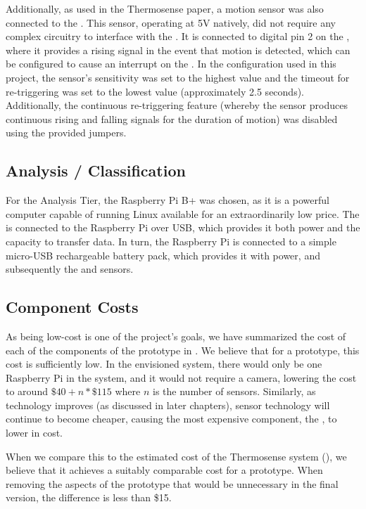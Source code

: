 \documentclass[../thesis/thesis.tex]{subfiles}
\begin{document}
Additionally, as used in the Thermosense paper, a \pir motion sensor \cite{AdafruitPIR} was also connected to the \ard. This sensor, operating at 5V natively, did not require any complex circuitry to interface with the \ard. It is connected to digital pin 2 on the \ard, where it provides a rising signal in the event that motion is detected, which can be configured to cause an interrupt on the \ard. In the configuration used in this project, the sensor's sensitivity was set to the highest value and the timeout for re-triggering was set to the lowest value (approximately 2.5 seconds). Additionally, the continuous re-triggering feature (whereby the sensor produces continuous rising and falling signals for the duration of motion) was disabled using the provided jumpers. 

\subsection{Analysis / Classification}

For the Analysis Tier, the Raspberry Pi B+ was chosen, as it is a powerful computer capable of running Linux available for an extraordinarily low price. The \ard is connected to the Raspberry Pi over USB, which provides it both power and the capacity to transfer data. In turn, the Raspberry Pi is connected to a simple micro-USB rechargeable battery pack, which provides it with power, and subsequently the \ard and sensors.

\subsection{Component Costs}
\label{subsec:cost}
As being low-cost is one of the project's goals, we have summarized the cost of each of the components of the prototype in . We believe that for a prototype, this cost is sufficiently low. In the envisioned system, there would only be one Raspberry Pi in the system, and it would not require a camera, lowering the cost to around $\$40 + n * \$115$ where $n$ is the number of sensors. Similarly, as technology improves (as discussed in later chapters), sensor technology will continue to become cheaper, causing the most expensive component, the \mlx, to lower in cost.

When we compare this to the estimated cost of the Thermosense system (), we believe that it achieves a suitably comparable cost for a prototype. When removing the aspects of the prototype that would be unnecessary in the final version, the difference is less than \$15.
\end{document}
